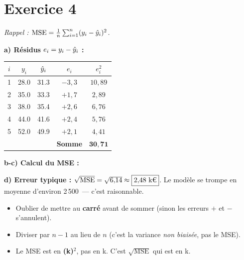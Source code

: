 \section*{Exercice 4 \hfill \exofondamental}
\textit{Rappel : $\text{MSE} = \frac{1}{n}\sum_{i=1}^{n}(y_i - \hat{y}_i)^2$.}

\separateur

\textbf{a) R\'{e}sidus $e_i = y_i - \hat{y}_i$ :}

\begin{center}
\renewcommand{\arraystretch}{1.2}
\begin{tabular}{c|c|c|c|c}
    \toprule
    $i$ & $y_i$ & $\hat{y}_i$ & $e_i$ & $e_i^2$ \\
    \midrule
    1 & 28.0 & 31.3 & $-3{,}3$  & $10{,}89$ \\
    2 & 35.0 & 33.3 & $+1{,}7$  & $2{,}89$  \\
    3 & 38.0 & 35.4 & $+2{,}6$  & $6{,}76$  \\
    4 & 44.0 & 41.6 & $+2{,}4$  & $5{,}76$  \\
    5 & 52.0 & 49.9 & $+2{,}1$  & $4{,}41$  \\
    \midrule
    & & & \textbf{Somme} & $\mathbf{30{,}71}$ \\
    \bottomrule
\end{tabular}
\end{center}

\textbf{b-c) Calcul du MSE :}

\textbf{d) Erreur typique :}
$\sqrt{\text{MSE}} = \sqrt{6{,}14} \approx \boxed{2{,}48 \text{ k\texteuro}}$.
Le mod\`{e}le se trompe en moyenne d'environ 2\,500\,\texteuro{} --- c'est raisonnable.

\begin{attentionbox}
    \begin{itemize}
        \item Oublier de mettre au \textbf{carr\'{e}} avant de sommer (sinon les erreurs $+$ et $-$ s'annulent).
        \item Diviser par $n-1$ au lieu de $n$ (c'est la variance \textit{non biais\'{e}e}, pas le MSE).
        \item Le MSE est en \textbf{(k\texteuro)$^2$}, pas en k\texteuro{}. C'est $\sqrt{\text{MSE}}$ qui est en k\texteuro.
    \end{itemize}
\end{attentionbox}

